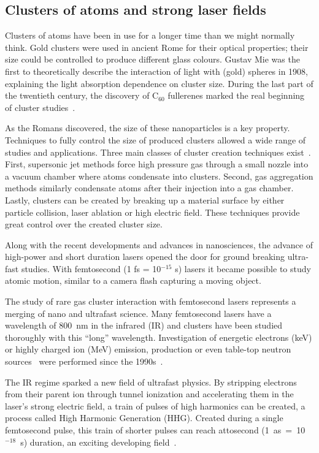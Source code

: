 \subsection{Clusters of atoms and strong laser fields}

Clusters of atoms have been in use for a longer time than we might normally
think. Gold clusters were used in ancient Rome for their optical
properties; their size could be controlled to produce different glass colours.
Gustav Mie was the first to theoretically describe the interaction of light
with (gold) spheres in 1908, explaining the light absorption dependence
on cluster size. During the last part of the twentieth century, the discovery of
C$_{60}$ fullerenes marked the real beginning of cluster studies~\cite{Reinhard2004}.

As the Romans discovered, the size of these nanoparticles is a key property. Techniques to fully
control the size of produced clusters allowed a wide range of studies and
applications. Three main classes of cluster creation techniques
exist~\cite{Reinhard2004}. First, supersonic jet methods force high pressure
gas through a small nozzle into a vacuum chamber where atoms condensate into
clusters. Second, gas aggregation methods similarly condensate atoms after
their injection into a gas chamber. Lastly, clusters can be created by breaking
up a material surface by either particle collision, laser ablation or high
electric field. These techniques provide great control over the created cluster
size.

Along with the recent developments and advances in nanosciences,
the advance of high-power and short duration lasers opened the
door for ground breaking ultra-fast studies. With femtosecond
(1 fs = 10$^{-15}$ s) lasers it became possible to study atomic motion,
similar to a camera flash capturing a moving object.


The study of rare gas cluster interaction with femtosecond lasers represents a
merging of nano and ultrafast science.
%
Many femtosecond lasers
have a wavelength of 800~nm in the infrared (IR) and clusters have been studied
thoroughly with this ``long'' wavelength. Investigation of energetic
electrons (keV) or highly charged ion (MeV) emission, \xray production or even
table-top neutron sources~\cite{Krainov2007} were performed since the
1990s~\cite{Haberland1994,Brabec2009}.


The IR regime sparked a new field of ultrafast physics. By stripping electrons
from their parent ion through tunnel ionization and accelerating them in the
laser's strong electric field, a train of pulses of high harmonics can be created,
a process called High Harmonic Generation (HHG).
Created during a single femtosecond pulse, this train of shorter pulses
can reach attosecond \mbox{(1 as = 10$^{-18}$ s)} duration, an exciting
developing field~\cite{Levesque2006}.


